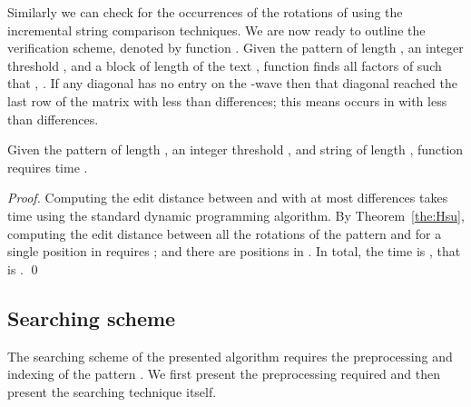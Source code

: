 \documentclass[runningheads, envcountsame, a4paper]{llncs}\usepackage{etex}
\newenvironment{myfunction}[2][htbp]
  {\setlength{\algomargin}{.2cm}
    \begin{center}
    \begin{minipage}{#2}
    \begin{function}[#1]
    \small
     \let\Par=\par
       \def\par{\endgraf\vspace{.1cm}}
           \SetKw{To}{to}\SetKw{Downto}{downto}\SetKw{Or}{or}\SetKwFor{Algo}{Function}{}{}\vspace{.15cm}}
   {\let\par=\Par
     \end{function}\end{minipage}\end{center}}
\begin{document}
Similarly we can check for the occurrences of the rotations of  using the incremental string comparison techniques.
We are now ready to outline the verification scheme, denoted by function . Given the pattern  of length , an integer threshold , and a block 
of length  of the text , function  finds all factors  of  such that , .
If any diagonal has no entry on the -wave then that diagonal reached the last row of the matrix with less than  differences; this means  occurs in  with less than  differences.
  \begin{myfunction}[H]{10 cm}
  \end{myfunction}
\begin{lemma}
Given the pattern  of length , an integer threshold , and string  of length , function  requires time .
\label{lem:ver}
\end{lemma}
\begin{proof}
Computing the edit distance between  and  with at most  differences takes time  using the standard dynamic programming algorithm.
By Theorem~\ref{the:Hsu}, computing the edit distance between all the rotations of the pattern and  for a single position in  requires ; 
and there are  positions in . In total, the time is , that is . \qed
\end{proof}
\subsection{Searching scheme}
The searching scheme of the presented algorithm requires the preprocessing and indexing of the pattern . 
We first present the preprocessing required and then present the searching technique itself.
\end{document}
